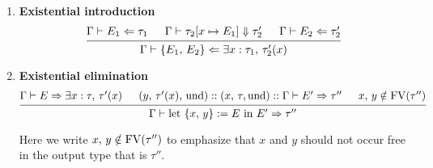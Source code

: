 \documentclass{article}
\begin{document}
\begin{enumerate}
\item \textbf{Existential introduction} \\
\[
    \begin{prooftree}
      \hypo{\Gamma \vdash E_1 \Leftarrow \tau_1}
      \hypo{\Gamma \vdash \tau_2[x \mapsto E_1] \Downarrow \tau_2'}
      \hypo{\Gamma \vdash E_2 \Leftarrow \tau_2'}
      \infer3{\Gamma \vdash \{E_1, \, E_2\} \Leftarrow 
        \exists x : \tau_1, \, \tau_2'(x)}
    \end{prooftree}
\]

\newpage

\item \textbf{Existential elimination} \\
\[
  \begin{prooftree}
   \hypo{\Gamma \vdash E \Rightarrow \exists x : \tau, \, \tau'(x)} 
   \hypo{(y, \, \tau'(x), \, \text{und}) :: (x, \, \tau, \text{und}) :: \Gamma \vdash
          E' \Rightarrow \tau''}
   \hypo{x, \, y \notin \FV(\tau'')}
   \infer3{\Gamma \vdash \text{let } \{x, \, y\} := E \text{ in } E' \Rightarrow \tau''}
  \end{prooftree}
\]

Here we write $x, \, y \notin \operatorname{FV}(\tau'')$ to emphasize that $x$ and $y$ 
should not occur free in the output type that is $\tau''$.





\end{enumerate}
\end{document}
